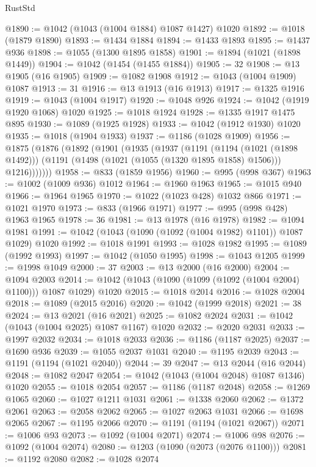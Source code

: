 \begin{lexlean}{RustStd}
\begin{coremodule}
@1890 := @1042 (@1043 (@1004 @1884) @1087 @1427) @1020
@1892 := @1018 (@1879 @1890)
@1893 := @1434 @1884
@1894 := @1433 @1893
@1895 := @1437 @936
@1898 := @1055 (@1300 @1895 @1858)
@1901 := @1894 (@1021 (@1898 @1449))
@1904 := @1042 (@1454 (@1455 @1884))
@1905 := 32
@1908 := @13 @1905 (@16 @1905)
@1909 := @1082 @1908
@1912 := @1043 (@1004 @1909) @1087
@1913 := 31
@1916 := @13 @1913 (@16 @1913)
@1917 := @1325 @1916
@1919 := @1043 (@1004 @1917)
@1920 := @1048 @926
@1924 := @1042 (@1919 @1920 @1068) @1020
@1925 := @1018 @1924
@1928 := @1335 @1917 @1475 @895
@1930 := @1089 (@1925 @1928)
@1933 := @1042 (@1912 @1930) @1020
@1935 := @1018 (@1904 @1933)
@1937 := @1186 (@1028 @1909)
@1956 := @1875
    (@1876
      (@1892
        (@1901
          (@1935
            (@1937
              (@1191
                (@1194 (@1021 (@1898 @1492)))
                (@1191 (@1498 (@1021 (@1055 (@1320 @1895 @1858) @1506))) @1216)))))))
@1958 := @833 (@1859 @1956)
@1960 := @995 (@998 @367)
@1963 := @1002 (@1009 @936) @1012
@1964 := @1960 @1963
@1965 := @1015 @940
@1966 := @1964 @1965
@1970 := @1022 (@1023 @428) @1032 @866
@1971 := @1021 @1970
@1973 := @833 (@1966 @1971)
@1977 := @995 (@998 @428) @1963 @1965
@1978 := 36
@1981 := @13 @1978 (@16 @1978)
@1982 := @1094 @1981
@1991 := @1042 (@1043 (@1090 (@1092 (@1004 @1982) @1101)) @1087 @1029) @1020
@1992 := @1018 @1991
@1993 := @1028 @1982
@1995 := @1089 (@1992 @1993)
@1997 := @1042 (@1050 @1995)
@1998 := @1043 @1205
@1999 := @1998 @1049
@2000 := 37
@2003 := @13 @2000 (@16 @2000)
@2004 := @1094 @2003
@2014 := @1042 (@1043 (@1090 (@1099 (@1092 (@1004 @2004) @1100))) @1087 @1029) @1020
@2015 := @1018 @2014
@2016 := @1028 @2004
@2018 := @1089 (@2015 @2016)
@2020 := @1042 (@1999 @2018)
@2021 := 38
@2024 := @13 @2021 (@16 @2021)
@2025 := @1082 @2024
@2031 := @1042 (@1043 (@1004 @2025) @1087 @1167) @1020
@2032 := @2020 @2031
@2033 := @1997 @2032
@2034 := @1018 @2033
@2036 := @1186 (@1187 @2025)
@2037 := @1690 @936
@2039 := @1055 @2037 @1031
@2040 := @1195 @2039
@2043 := @1191 (@1194 (@1021 @2040))
@2044 := 39
@2047 := @13 @2044 (@16 @2044)
@2048 := @1082 @2047
@2054 := @1042 (@1043 (@1004 @2048) @1087 @1346) @1020
@2055 := @1018 @2054
@2057 := @1186 (@1187 @2048)
@2058 := @1269 @1065
@2060 := @1027 @1211 @1031
@2061 := @1338 @2060
@2062 := @1372 @2061
@2063 := @2058 @2062
@2065 := @1027 @2063 @1031
@2066 := @1698 @2065
@2067 := @1195 @2066
@2070 := @1191 (@1194 (@1021 @2067))
@2071 := @1006 @93
@2073 := @1092 (@1004 @2071)
@2074 := @1006 @98
@2076 := @1092 (@1004 @2074)
@2080 := @1203 (@1090 (@2073 (@2076 @1100)))
@2081 := @1192 @2080
@2082 := @1028 @2074

\end{coremodule}
\end{lexlean}

